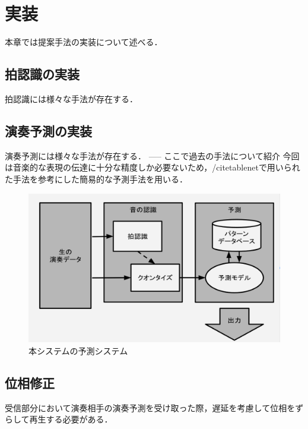 \chapter{実装}
\label{implementation}

本章では提案手法の実装について述べる．

\section{拍認識の実装}
拍認識には様々な手法が存在する．

\section{演奏予測の実装}
演奏予測には様々な手法が存在する．
----- ここで過去の手法について紹介
今回は音楽的な表現の伝達に十分な精度しか必要ないため，/cite{tablenet}で用いられた手法を参考にした簡易的な予測手法を用いる．

\begin{figure}[htbp]
  \centering
  \includegraphics[width=0.8\linewidth]{src/pred.png}
  \caption{本システムの予測システム}
  \label{fig:tablenet}
\end{figure}

\section{位相修正}
受信部分において演奏相手の演奏予測を受け取った際，遅延を考慮して位相をずらして再生する必要がある．


